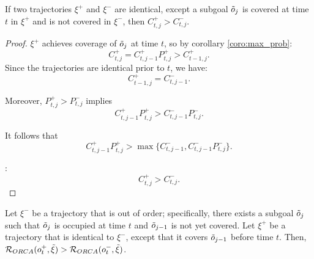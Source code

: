 \begin{corollary}
\label{coro:coverage}
If two trajectories $\xi^{+}$ and $\xi^{-}$ are identical, except a subgoal $\tilde{o}_{j}$ is covered at time $t$ in $\xi^{+}$ and is not covered in $\xi^{-}$, then $C^{+}_{t, j} > C^{-}_{t, j}$.
\end{corollary}
\begin{proof}
$\xi^{+}$ achieves coverage of $\tilde{o}_{j}$ at time $t$, so by corollary \ref{coro:max_prob}:
\begin{equation}
C^{+}_{t, j} = C^{+}_{t, j-1} P^{+}_{t, j} > C^{+}_{t-1, j}.
\end{equation}
Since the trajectories are identical prior to $t$,
we have:
\begin{equation}
C^{+}_{t-1, j} = C^{-}_{t, j-1}.
\end{equation}

Moreover, $P^{+}_{t, j} > P^{-}_{t, j}$ implies
\begin{equation}
C^{+}_{t, j-1} P^{+}_{t, j} > C^{-}_{t, j-1} P^{-}_{t, j}.
\end{equation}

It follows that
\begin{equation}
C^{+}_{t, j-1} P^{+}_{t, j} > \max\{ C^{-}_{t, j-1}, C^{-}_{t, j-1} P^{-}_{t, j} \}. 
\end{equation}

:
\begin{equation}
C^{+}_{t, j} > C^{-}_{t, j}.
\end{equation}
\end{proof}

\begin{proposition}
Let $\xi^{-}$ be a trajectory that is out of order; specifically, there exists a subgoal $\tilde{o}_{j}$ such that $\tilde{o}_{j}$ is occupied at time $t$ and $\tilde{o}_{j-1}$ is not yet covered. Let $\xi^{+}$ be a trajectory that is identical to $\xi^{-}$, except that it covers $\tilde{o}_{j-1}$ before time $t$. Then, $\mathcal{R}_{ORCA}(o^{+}_t, \tilde{\xi}) > \mathcal{R}_{ORCA}(o^{-}_t, \tilde{\xi})$.
\end{proposition}

